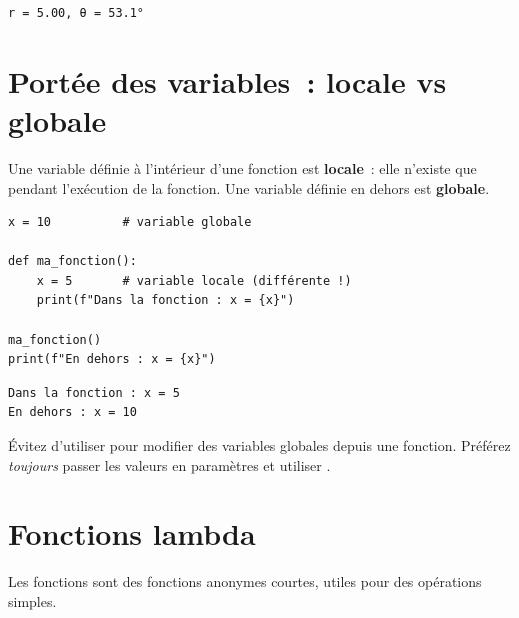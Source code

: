 \begin{codeoutput}
\begin{verbatim}
r = 5.00, θ = 53.1°
\end{verbatim}
\end{codeoutput}

\section{Port\'ee des variables~: locale vs globale}

\begin{definition}
Une variable d\'efinie \`a l'int\'erieur d'une fonction est \textbf{locale}~: elle n'existe
que pendant l'ex\'ecution de la fonction. Une variable d\'efinie en dehors est
\textbf{globale}.
\end{definition}

\begin{codeblock}[title=\textbf{Python}]
\begin{verbatim}
x = 10          # variable globale

def ma_fonction():
    x = 5       # variable locale (différente !)
    print(f"Dans la fonction : x = {x}")

ma_fonction()
print(f"En dehors : x = {x}")
\end{verbatim}
\end{codeblock}

\begin{codeoutput}
\begin{verbatim}
Dans la fonction : x = 5
En dehors : x = 10
\end{verbatim}
\end{codeoutput}

\begin{attention}
\'Evitez d'utiliser  pour modifier des variables globales depuis une
fonction. Pr\'ef\'erez \emph{toujours} passer les valeurs en param\`etres et utiliser
.
\end{attention}

\section{Fonctions lambda}

Les fonctions  sont des fonctions anonymes courtes, utiles pour des
op\'erations simples.


